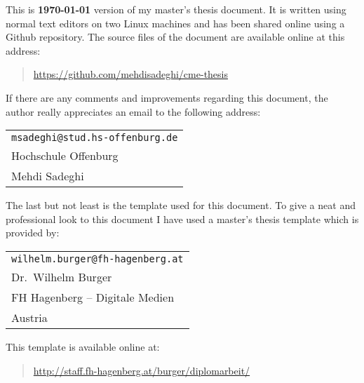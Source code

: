 This is \textbf{\today} version of my master's thesis document. It is written using 
normal text editors on two Linux machines and has been shared 
online using a Github repository. The source files of the document are available 
online at this address:

%
\begin{quote}
\url{https://github.com/mehdisadeghi/cme-thesis}
\end{quote}
%

If there are any comments and improvements regarding this document, the author really
appreciates an email to the following address:

\begin{center}%
\begin{tabular}{l}
\nolinkurl{msadeghi@stud.hs-offenburg.de} \\
Hochschule Offenburg\\
Mehdi Sadeghi
\end{tabular}
\end{center}

The last but not least is the template used for this document. To give a neat and
professional look to this document I have used a master's thesis template which is
provided by:
\begin{center}%
\begin{tabular}{l}
\nolinkurl{wilhelm.burger@fh-hagenberg.at} \\
Dr.\ Wilhelm Burger \\
FH Hagenberg -- Digitale Medien\\
Austria
\end{tabular}
\end{center} 
This template is available online at:

%
\begin{quote}
\url{http://staff.fh-hagenberg.at/burger/diplomarbeit/}
\end{quote}
%





